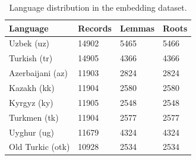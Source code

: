 \begin{table}[ht]
\centering
\caption{Language distribution in the embedding dataset.}
\label{tab:language\_distribution}
\begin{tabular}{llll}
\hline
Language & Records & Lemmas & Roots \\
\hline
Uzbek (uz) & 14902 & 5465 & 5466 \\
Turkish (tr) & 14905 & 4366 & 4366 \\
Azerbaijani (az) & 11903 & 2824 & 2824 \\
Kazakh (kk) & 11904 & 2580 & 2580 \\
Kyrgyz (ky) & 11905 & 2548 & 2548 \\
Turkmen (tk) & 11904 & 2577 & 2577 \\
Uyghur (ug) & 11679 & 4324 & 4324 \\
Old Turkic (otk) & 10928 & 2534 & 2534 \\
\hline
\end{tabular}
\end{table}
